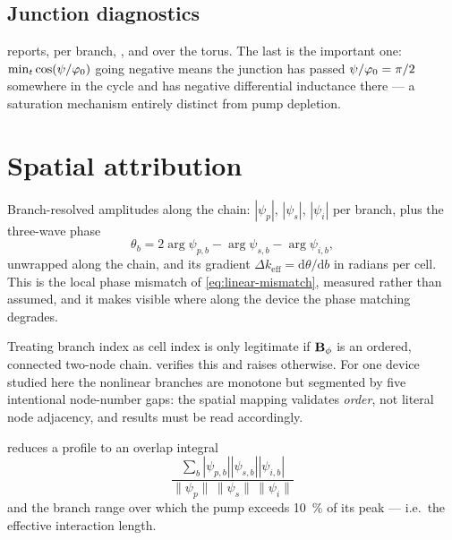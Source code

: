 \subsection{Junction diagnostics}

 reports, per branch,
,  and  over the
torus. The last is the important one: $\min_t\cos(\psi/\varphi_{0})$ going negative
means the junction has passed $\psi/\varphi_{0}=\pi/2$ somewhere in the cycle and has
negative differential inductance there --- a saturation mechanism entirely
distinct from pump depletion.

\section{Spatial attribution}
\label{sec:spatial}

\begin{implnote}
Branch-resolved amplitudes along the chain: $|\psi_p|$, $|\psi_s|$, $|\psi_i|$
per branch, plus the three-wave phase
\begin{equation}
  \theta_b = 2\arg\psi_{p,b} - \arg\psi_{s,b} - \arg\psi_{i,b},
\end{equation}
unwrapped along the chain, and its gradient
$\Delta k_{\mathrm{eff}} = \mathrm{d}\theta/\mathrm{d}b$ in radians per cell.
This is the local phase mismatch of \eqref{eq:linear-mismatch}, measured rather
than assumed, and it makes visible where along the device the phase matching
degrades.
\end{implnote}

\begin{caveat}
Treating branch index as cell index is only legitimate if $\mathbf{B}_{\phi}$ is an ordered,
connected two-node chain.  verifies this and raises
otherwise. For one device studied here the nonlinear branches are monotone but
segmented by five intentional node-number gaps: the spatial mapping validates
\emph{order}, not literal node adjacency, and results must be read accordingly.
\end{caveat}

 reduces a profile to an overlap integral
\begin{equation}
  \frac{\sum_b |\psi_{p,b}||\psi_{s,b}||\psi_{i,b}|}
       {\|\psi_p\|\,\|\psi_s\|\,\|\psi_i\|}
\end{equation}
and the branch range over which the pump exceeds \SI{10}{\percent} of its peak
--- i.e.\ the effective interaction length.

